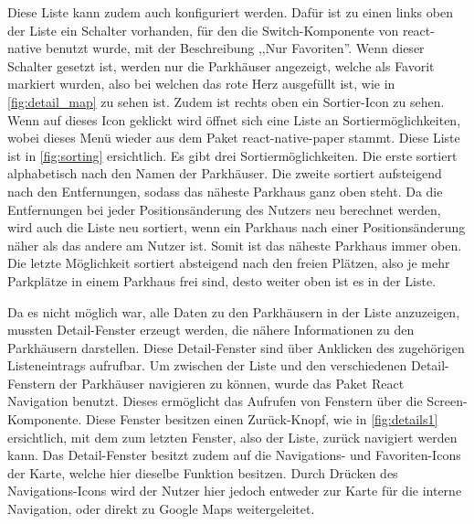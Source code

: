 Diese Liste kann zudem auch konfiguriert werden. Dafür ist zu einen links oben der Liste ein Schalter vorhanden, für den die Switch-Komponente von react-native benutzt wurde, mit der Beschreibung ,,Nur Favoriten''. Wenn dieser Schalter gesetzt ist, werden nur die Parkhäuser angezeigt, welche als Favorit markiert wurden, also bei welchen das rote Herz ausgefüllt ist, wie in \autoref{fig:detail_map} zu sehen ist. Zudem ist rechts oben ein Sortier-Icon zu sehen. Wenn auf dieses Icon geklickt wird öffnet sich eine Liste an Sortiermöglichkeiten, wobei dieses Menü wieder aus dem Paket react-native-paper stammt. Diese Liste ist in \autoref{fig:sorting} ersichtlich. Es gibt drei Sortiermöglichkeiten. Die erste sortiert alphabetisch nach den Namen der Parkhäuser. Die zweite sortiert aufsteigend nach den Entfernungen, sodass das näheste Parkhaus ganz oben steht. Da die Entfernungen bei jeder Positionsänderung des Nutzers neu berechnet werden, wird auch die Liste neu sortiert, wenn ein Parkhaus nach einer Positionsänderung näher als das andere am Nutzer ist. Somit ist das näheste Parkhaus immer oben. Die letzte Möglichkeit sortiert absteigend nach den freien Plätzen, also je mehr Parkplätze in einem Parkhaus frei sind, desto weiter oben ist es in der Liste.

Da es nicht möglich war, alle Daten zu den Parkhäusern in der Liste anzuzeigen, mussten Detail-Fenster erzeugt werden, die nähere Informationen zu den Parkhäusern darstellen. Diese Detail-Fenster sind über Anklicken des zugehörigen Listeneintrags aufrufbar. Um zwischen der Liste und den verschiedenen Detail-Fenstern der Parkhäuser navigieren zu können, wurde das Paket React Navigation benutzt. Dieses ermöglicht das Aufrufen von Fenstern über die Screen-Komponente. Diese Fenster besitzen einen Zurück-Knopf, wie in \autoref{fig:details1} ersichtlich, mit dem zum letzten Fenster, also der Liste, zurück navigiert werden kann. Das Detail-Fenster besitzt zudem auf die Navigations- und Favoriten-Icons der Karte, welche hier dieselbe Funktion besitzen. Durch Drücken des Navigations-Icons wird der Nutzer hier jedoch entweder zur Karte für die interne Navigation, oder direkt zu Google Maps weitergeleitet.
\newpage

